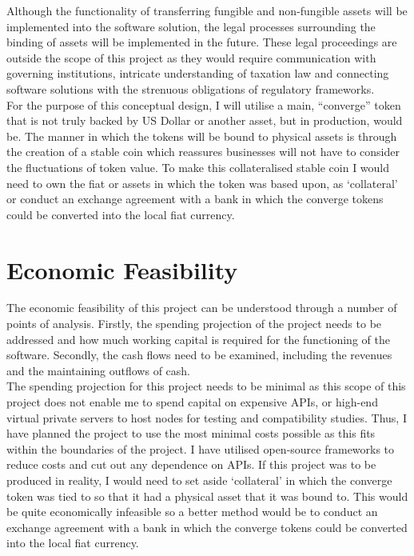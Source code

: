 Although the functionality of transferring fungible and non-fungible assets will be implemented into the software solution, the legal processes surrounding the binding of assets will be implemented in the future. These legal proceedings are outside the scope of this project as they would require communication with governing institutions, intricate understanding of taxation law and connecting software solutions with the strenuous obligations of regulatory frameworks. \\

For the purpose of this conceptual design, I will utilise a main, “converge” token that is not truly backed by US Dollar or another asset, but in production, would be. The manner in which the tokens will be bound to physical assets is through the creation of a stable coin which reassures businesses will not have to consider the fluctuations of token value. To make this collateralised stable coin I would need to own the fiat or assets in which the token was based upon, as ‘collateral’ or conduct an exchange agreement with a bank in which the converge tokens could be converted into the local fiat currency. \\

\section{Economic Feasibility}
The economic feasibility of this project can be understood through a number of points of analysis. Firstly, the spending projection of the project needs to be addressed and how much working capital is required for the functioning of the software. Secondly, the cash flows need to be examined, including the revenues and the maintaining outflows of cash. \\

The spending projection for this project needs to be minimal as this scope of this project does not enable me to spend capital on expensive APIs, or high-end virtual private servers to host nodes for testing and compatibility studies. Thus, I have planned the project to use the most minimal costs possible as this fits within the boundaries of the project. I have utilised open-source frameworks to reduce costs and cut out any dependence on APIs. If this project was to be produced in reality, I would need to set aside ‘collateral’ in which the converge token was tied to so that it had a physical asset that it was bound to. This would be quite economically infeasible so a better method would be to conduct an exchange agreement with a bank in which the converge tokens could be converted into the local fiat currency. \\

